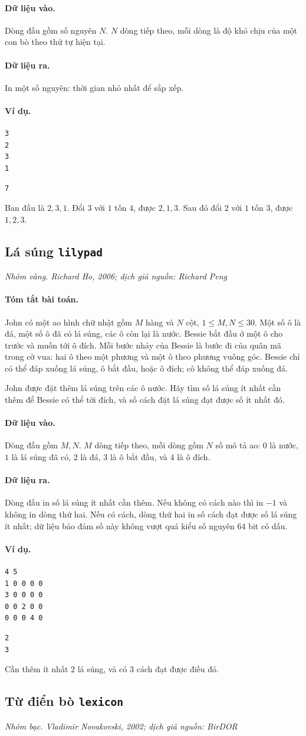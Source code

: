 \documentclass[11pt]{article}
\newcommand{\problem}[4]{%
  \subsection[#1 (#2)]{#1 \hfill {\normalsize\texttt{#2}}}%
  \noindent\textit{#3. #4}\par\smallskip
}
\newcommand{\iosec}[1]{\paragraph{#1}}
\begin{document}
\iosec{Dữ liệu vào.}
Dòng đầu gồm số nguyên \(N\). \(N\) dòng tiếp theo, mỗi dòng là độ khó chịu
của một con bò theo thứ tự hiện tại.

\iosec{Dữ liệu ra.}
In một số nguyên: thời gian nhỏ nhất để sắp xếp.

\iosec{Ví dụ.}
\begin{verbatim}
3
2
3
1
\end{verbatim}

\begin{verbatim}
7
\end{verbatim}

Ban đầu là \(2,3,1\). Đổi \(3\) với \(1\) tốn \(4\), được \(2,1,3\). Sau đó
đổi \(2\) với \(1\) tốn \(3\), được \(1,2,3\).

\problem{Lá súng}{lilypad}{Nhóm vàng}{Richard Ho, 2006; dịch giả nguồn: Richard Peng}

\iosec{Tóm tắt bài toán.}
John có một ao hình chữ nhật gồm \(M\) hàng và \(N\) cột,
\(1\le M,N\le 30\). Một số ô là đá, một số ô đã có lá súng, các ô còn lại là
nước. Bessie bắt đầu ở một ô cho trước và muốn tới ô đích. Mỗi bước nhảy của
Bessie là bước đi của quân mã trong cờ vua: hai ô theo một phương và một ô
theo phương vuông góc. Bessie chỉ có thể đáp xuống lá súng, ô bắt đầu, hoặc
ô đích; cô không thể đáp xuống đá.

John được đặt thêm lá súng trên các ô nước. Hãy tìm số lá súng ít nhất cần
thêm để Bessie có thể tới đích, và số cách đặt lá súng đạt được số ít nhất đó.

\iosec{Dữ liệu vào.}
Dòng đầu gồm \(M,N\). \(M\) dòng tiếp theo, mỗi dòng gồm \(N\) số mô tả ao:
\(0\) là nước, \(1\) là lá súng đã có, \(2\) là đá, \(3\) là ô bắt đầu, và
\(4\) là ô đích.

\iosec{Dữ liệu ra.}
Dòng đầu in số lá súng ít nhất cần thêm. Nếu không có cách nào thì in
\(-1\) và không in dòng thứ hai. Nếu có cách, dòng thứ hai in số cách đạt được
số lá súng ít nhất; dữ liệu bảo đảm số này không vượt quá kiểu số nguyên
64 bit có dấu.

\iosec{Ví dụ.}
\begin{verbatim}
4 5
1 0 0 0 0
3 0 0 0 0
0 0 2 0 0
0 0 0 4 0
\end{verbatim}

\begin{verbatim}
2
3
\end{verbatim}

Cần thêm ít nhất \(2\) lá súng, và có \(3\) cách đạt được điều đó.

\problem{Từ điển bò}{lexicon}{Nhóm bạc}{Vladimir Novakovski, 2002; dịch giả nguồn: BirDOR}
\end{document}
